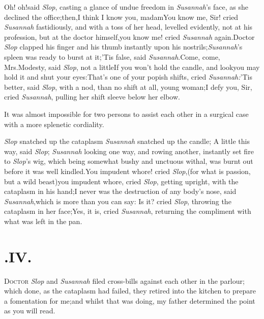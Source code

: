 \documentclass{article}
\begin{document}
\tsh Oh! oh!\tsh said \textit{Slop},
casting a glance of undue freedom in \textit{Susannah}’s face,
as she declined the office;\tsk then,\break I think I know you,
madam\tsh You know me, Sir! cried \textit{Susannah}
fastidiously, and with a toss of her head, levelled evidently, not
at his profession, but at the doctor himself,\tsk you know\break
me! cried \textit{Susannah} again.\tsk Doctor \textit{Slop}
clapped his finger and his thumb instantly upon his
nostrils;\tsh \textit{Susannah}’s spleen was ready to
burst at it;\tsh ’Tis false, said
\textit{Susannah}.\tsk Come, come, Mrs.\@ Modesty, said \textit{Slop},
not a little\break{}\break\tsh If you won’t hold the candle, and
look\tsk you may hold it and shut your eyes:\tsk That’s
one of your popish shifts, cried \textit{Susannah:}\tsk ’Tis
better, said \textit{Slop}, with a nod, than no shift at all, young
woman;\tsh I defy you, Sir, cried \textit{Susannah}, pulling
her shift sleeve below her elbow.

It was almost impossible for two persons to assist each other in
a surgical case with a more splenetic cordiality.


\textit{Slop} snatched up the cataplasm\tsh\break
\textit{Susannah} snatched up the candle;\tsh\break
A little this way, said \textit{Slop}; \textit{Susannah}
looking one way, and rowing another, instantly set fire to \textit{Slop}’s
wig, which being somewhat bushy and unctuous withal, was burnt out before it
was well kindled.\tsh You impudent whore! cried
\textit{Slop},\tsk (for what is passion, but a wild beast)\tsk you impudent
whore, cried \textit{Slop}, getting upright, with the cataplasm in his
hand;\tsh I never was the destruction of any body’s nose, said
\textit{Susannah},\tsk which is more than you can say: \tsh Is it?
cried \textit{Slop}, throwing the cataplasm in her face;\tsh Yes, it is,
cried \textit{Susannah}, returning the compliment with what was left in the pan.\tsh

\vskip -6pt

\section{.\enspace IV.}

\lettrine{D}{octor} \textit{Slop} and
\textit{Susannah} filed cross-bills against each other in the
parlour; which done, as the cataplasm had failed, they retired into
the kitchen to prepare a fomentation for me;\tsk and whilst that was doing, my father determined the
point as you will read.
\end{document}
